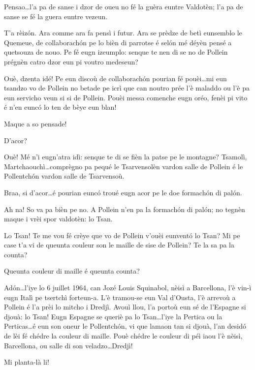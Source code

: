 \begin{drama}

\Laurentspeaks{} Pensao\ldots l'a pa de sanse i dzor de oueu no fé la guèra euntre Valdotèn; l'a pa de sanse se fé la guera euntre vezeun.

\Taniaspeaks T'a rèiz\'on. Ara comme ara fa pensì i futur. Ara se prèdze de betì eunsemblo le Quemeue, de collaborach\'on pe lo bièn di parrotse é sel\'on mé déyèn pensé a quetsouza de nouo. Pe fé eugn izeumplo: senque te nen di se no de Pollein prégnèn catro dzor eun pi voutro medeseun?

\Laurentspeaks Ouè, dzenta idé! Pe eun discoù de collaborach\'on pourian fé pouèi\ldots mi eun tsandzo vo de Pollein no betade pe icrì que can noutro prée l'è maladdo ou l'è pa eun servicho veun si si de Pollein. Pouèi messa comenche eugn oréo, fenèi pi vito é n'en eunc\'o lo ten de bèye eun blan!

\Taniaspeaks Maque a so pensade!

\Laurentspeaks D'acor?

\Taniaspeaks Ouè! Mé n'i eugn'atra idì: senque te di se fièn la patse pe le montagne? Tsamolì, Martchaouchì\ldots comprègno pa pequé le Tsarvensolèn vardon salle de Pollein é le Pollentch\'on vardon salle de Tsarvensoù.

\Laurentspeaks Braa, si d'acor\ldots é pourian eunc\'o troué eugn acor pe le doe formach\'on di pal\'on.

\Taniaspeaks Ah na! So va pa bièn pe no. A Pollein n'en pa la formach\'on di pal\'on; no tegnèn maque i vrèi spor valdotèn: lo Tsan.

\Laurentspeaks Lo Tsan! Te me vou fé crèye que vo de Pollein v'ouèi eunvent\'o lo Tsan? Mi pe case t'a vi de queunta couleur son le maille de sise de Pollein? Te la sa pa la counta?

\Taniaspeaks Queunta couleur di maille é queunta counta?

\Laurentspeaks Ad\'on\ldots l'iye lo 6 juillet 1964, can Jozé Louis Squinabol, nèisì a Barcellona, l'è vin-ì eugn Italì pe tsertchì forteun-a. L'è tramou-se eun Val d'Ousta, l'è arrevoù a Pollein é l'a prèi lo mitcho i Dredjì. Avouì llou, l'a portoù eun sé de l'Espagne si djouà: lo Tsan! Eugn Espagne se queriè pa lo Tsan\ldots l'iye la Pertica ou la Perticas\ldots é eun son oneur le Pollentch\'on, vi que lamaon tan si djouà, l'an desid\'o de lèi fé chédre la couleur di maille. Pouè chédre le couleur di péì iaou l'è nèisì, Barcellona, ou salle di son veladzo\ldots Dredjì!

\Taniaspeaks Mi planta-là li!


\end{drama}
